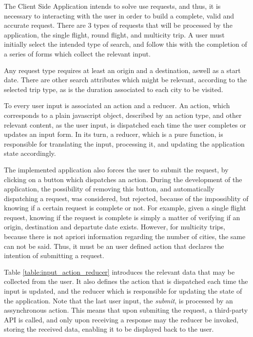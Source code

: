 The Client Side Application intends to solve use requests, and thus, it is necessary 
to interacting with the user in order to build a complete, valid and accurate request.
There are 3 types of requests that will be processed by the application,
the single flight, round flight, and multicity trip.
A user must initially select the intended type of search,
and follow this with the completion of a series of forms which collect
the relevant input. 

Any request type requires at least an origin and a destination, aswell as a start date.
There are other search attributes which might be relevant, according to the selected trip type,
as is the duration associated to each city to be visited.

To every user input is associated an action and a reducer. An action,
which corresponds to a plain javascript object,
described by an action type, and other relevant content, as the user input, is dispatched each time 
the user completes or updates an input form. In its turn, a reducer,
which is a pure function, is responsible for 
translating the input, processing it, and updating the application state accordingly.

The implemented application also forces the user to submit the request,
by clicking on a button which dispatches an action. During the development of the application,
the possibility of removing this button, and automatically dispatching a request, was considered, but rejected,
because of the impossiblity of knowing if a certain request is complete or not.
For example, given a single flight request, knowing if the request is complete 
is simply a matter of verifying if an origin, destination and departute date exists.
However, for multicity trips, because there is not apriori information regarding the number of cities,
the same can not be said. Thus, it must be an user defined action that declares the intention of submitting a request.

Table \ref{table:input_action_reducer} introduces the relevant data that may be collected from the user.
It also defines the action that is dispatched each time the input is updated,
and the reducer which is responsible for updating the state of the application.
Note that the last user input, the \textit{submit}, is processed by an assynchronous action.
This means that upon submiting the request, a third-party API is called,
and only upon receiving a response may the reducer be invoked,
storing the received data, enabling it to be displayed back to the user.


